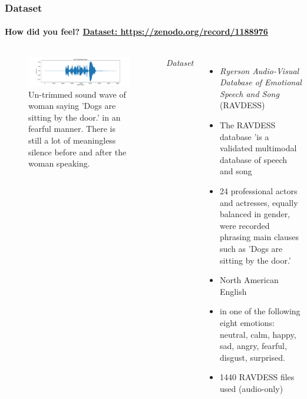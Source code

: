 \documentclass[10pt,usepdftitle=false,aspectratio=169]{beamer}
\begin{document}


\begin{frame}\frametitle{Dataset}
    \framesubtitle{How did you feel?  \hspace*{30em} \href{https://zenodo.org/record/1188976}{Dataset: https://zenodo.org/record/1188976}}
    
    \vspace{1.5em}


  
	\begin{columns}
		\begin{figure}
			\centering
			\includegraphics[width=.8\textwidth]{figures/untr_raw_wave.pdf}
			\caption{Un-trimmed sound wave of woman saying 'Dogs are sitting by the door.' in an fearful manner. There is still a lot of meaningless silence before and after the woman speaking. }
			\label{fig:untrimmed sw}
		\end{figure}
\emph{Dataset}
\begin{itemize}
	\item \textit{Ryerson Audio-Visual Database of Emotional Speech and Song} (RAVDESS)
	\item The RAVDESS database 'is a validated multimodal database of speech and song 
	\item  24 professional actors and actresses, equally balanced in gender, were recorded phrasing main clauses such as  'Dogs are sitting by the door.' 
	\item  North American English 
	\item in one of the following eight emotions: neutral, calm, happy, sad, angry, fearful, disgust, surprised.
	\item  1440 RAVDESS files used  (audio-only) 
	
\end{itemize}
	\end{columns}


\end{frame}
\end{document}
